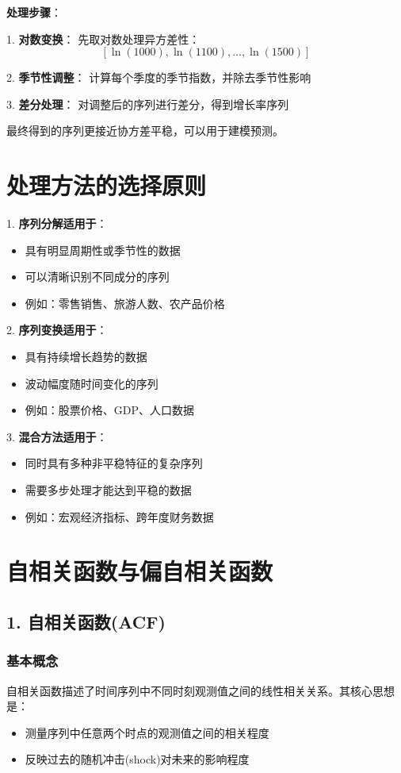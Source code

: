 \textbf{处理步骤}：

1. \textbf{对数变换}：
   先取对数处理异方差性：
   $$[\ln(1000), \ln(1100), ..., \ln(1500)]$$

2. \textbf{季节性调整}：
   计算每个季度的季节指数，并除去季节性影响

3. \textbf{差分处理}：
   对调整后的序列进行差分，得到增长率序列

最终得到的序列更接近协方差平稳，可以用于建模预测。

\section{处理方法的选择原则}

1. \textbf{序列分解适用于}：
\begin{itemize}
    \item 具有明显周期性或季节性的数据
    \item 可以清晰识别不同成分的序列
    \item 例如：零售销售、旅游人数、农产品价格
\end{itemize}

2. \textbf{序列变换适用于}：
\begin{itemize}
    \item 具有持续增长趋势的数据
    \item 波动幅度随时间变化的序列
    \item 例如：股票价格、GDP、人口数据
\end{itemize}

3. \textbf{混合方法适用于}：
\begin{itemize}
    \item 同时具有多种非平稳特征的复杂序列
    \item 需要多步处理才能达到平稳的数据
    \item 例如：宏观经济指标、跨年度财务数据
\end{itemize}




\section{自相关函数与偏自相关函数}

\subsection{1. 自相关函数(ACF)}

\subsubsection{基本概念}
自相关函数描述了时间序列中不同时刻观测值之间的线性相关关系。其核心思想是：
\begin{itemize}
    \item 测量序列中任意两个时点的观测值之间的相关程度
    \item 反映过去的随机冲击(shock)对未来的影响程度
\end{itemize}

